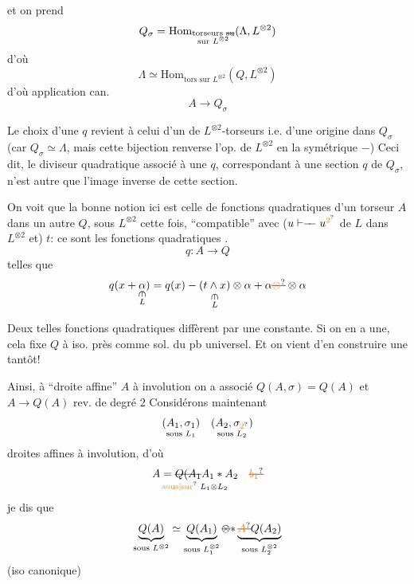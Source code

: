 et on prend
\[
Q_\sigma=\mathrm{Hom}_{\substack{\text{torseurs }\deleted{\text{su}}\\\text{sur }L^{\otimes 2}}}(\Lambda,L^{\otimes 2})
\]
d'où
\[
\Lambda\simeq\mathrm{Hom}_{\text{tors sur }L^{\otimes 2}}(Q,L^{\otimes2})
\]
d'où  application can.
\[
A\longrightarrow Q_\sigma
\]

Le choix d'une $q$ \inserted{$\in\Lambda$} revient à celui
d'un  de $L^{\otimes 2}$-torseurs i.e. d'une
origine dans $Q_\sigma$ (car $Q_\sigma\simeq\Lambda$,
mais cette bijection renverse l'op.
de $L^{\otimes 2}$ en la symétrique $-$) Ceci dit,
le diviseur quadratique  associé à une
$q$, correspondant à une section $q$ de $Q_\sigma$,
n'est autre que l'image inverse de cette
section.

On voit que la bonne notion ici
est celle de fonctions  quadratiques
d'un torseur $A$ dans un autre
$Q$, sous $L^{\otimes 2}$ cette fois, ``compatible''
avec \deleted{\unsure{$\sigma$}} ($u\mathrel{\vdash\!\!-\!\!-}u^{\unsure{2}}$ de $L$ dans $L^{\otimes 2}$ et) $t$: ce
sont les fonctions  quadratiques
 .
\[
q:A\longrightarrow Q
\]
telles que
\[
q(x+\underset{\substack{\rotatebox{-90}{$\in$}\\L}}{\alpha})=q(x)-
\underset{\substack{\rotatebox{-90}{$\in$}\\L}}{(t\wedge x)}\otimes\alpha+
\alpha\deleted{\unsure{\otimes}}\otimes\alpha
\]

Deux telles fonctions  quadratiques diffèrent
par une constante. Si on en a une,
cela fixe $Q$ à iso. près comme
sol. du pb universel. Et on vient
d'en construire une tantôt!

Ainsi, à  ``droite affine'' $A$ à involution
on a associé $Q(A,\sigma)=Q(A)$
et $A\longrightarrow Q(A)$ rev. de degré $2$
Considérons maintenant
\[
\underset{\text{sous }L_1}{(A_1,\sigma_1)}\quad
\underset{\text{sous }L_2}{(A_2,\sigma_{\unsure{2}})}
\]
droites affines à involution, d'où
\[
\underset{\text{\unsure{sous|sur} }L_1\otimes L_2}{A=\deleted{Q(A_1}A_1*A_2}
\quad\deleted{\unsure{b_1}}
\]
je dis que
\[
\underbrace{Q(A)}_{\text{sous }L^{\otimes 2}}\simeq
\underbrace{Q(A_1)}_{\text{sous }L_1^{\otimes 2}}
\deleted{\otimes}{*}\underbrace{\deleted{\unsure{A}}Q(A_2)}_{\text{sous }L_2^{\otimes 2}}
\]
(iso canonique)

